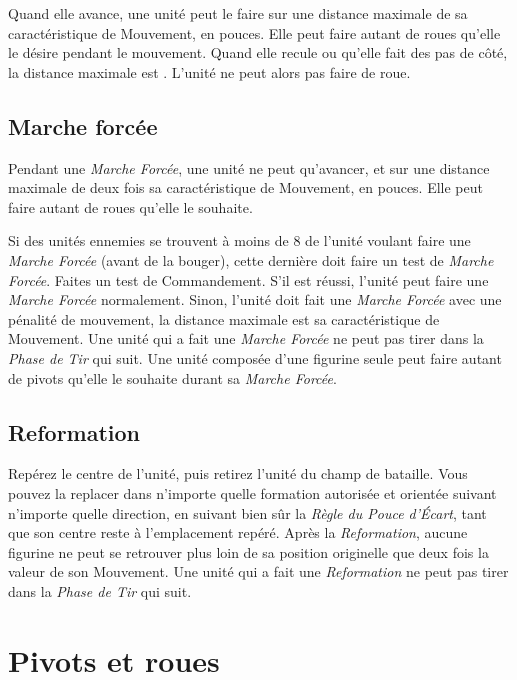 Quand elle avance, une unité peut le faire sur une distance maximale de sa caractéristique de Mouvement, en pouces. Elle peut faire autant de roues qu'elle le désire pendant le mouvement. Quand elle recule ou qu'elle fait des pas de côté, la distance maximale est . L'unité ne peut alors pas faire de roue.

\subsection{Marche forcée}

Pendant une \emph{Marche Forcée}, une unité ne peut qu'avancer, et sur une distance maximale de deux fois sa caractéristique de Mouvement, en pouces. Elle peut faire autant de roues qu'elle le souhaite.

Si des unités ennemies se trouvent à moins de 8{\pouce} de l'unité voulant faire une \emph{Marche Forcée} (avant de la bouger), cette dernière doit faire un test de \emph{Marche Forcée}. Faites un test de Commandement. S'il est réussi, l'unité peut faire une \emph{Marche Forcée} normalement. Sinon, l'unité doit fait une \emph{Marche Forcée} avec une pénalité de mouvement, la distance maximale est sa caractéristique de Mouvement. Une unité qui a fait une \emph{Marche Forcée} ne peut pas tirer dans la \emph{Phase de Tir} qui suit. Une unité composée d'une figurine seule peut faire autant de pivots qu'elle le souhaite durant sa \emph{Marche Forcée}.

\subsection{Reformation}

Repérez le centre de l'unité, puis retirez l'unité du champ de bataille. Vous pouvez la replacer dans n'importe quelle formation autorisée et orientée suivant n'importe quelle direction, en suivant bien sûr la \emph{Règle du Pouce d'Écart}, tant que son centre reste à l'emplacement repéré. Après la \emph{Reformation}, aucune figurine ne peut se retrouver plus loin de sa position originelle que deux fois la valeur de son Mouvement. Une unité qui a fait une \emph{Reformation} ne peut pas tirer dans la \emph{Phase de Tir} qui suit.

\section{Pivots et roues}

